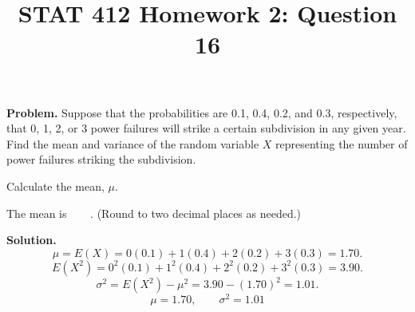 \documentclass[11pt]{article}
\title{STAT 412 Homework 2: Question 16}
\author{}
\date{}
\begin{document}
\maketitle
\textbf{Problem.} Suppose that the probabilities are 0.1, 0.4, 0.2, and 0.3,
respectively, that 0, 1, 2, or 3 power failures will strike a certain
subdivision in any given year. Find the mean and variance of the random
variable \(X\) representing the number of power failures striking the
subdivision.

Calculate the mean, \(\mu\).

The mean is \(\boxed{\phantom{0.00}}\). (Round to two decimal places as needed.)

\textbf{Solution.}
\[
\mu=E(X)=0(0.1)+1(0.4)+2(0.2)+3(0.3)=1.70.
\]
\[
E(X^2)=0^2(0.1)+1^2(0.4)+2^2(0.2)+3^2(0.3)=3.90.
\]
\[
\sigma^2=E(X^2)-\mu^2=3.90-(1.70)^2=1.01.
\]
\[
\boxed{\mu=1.70,\qquad \sigma^2=1.01}
\]
\end{document}
